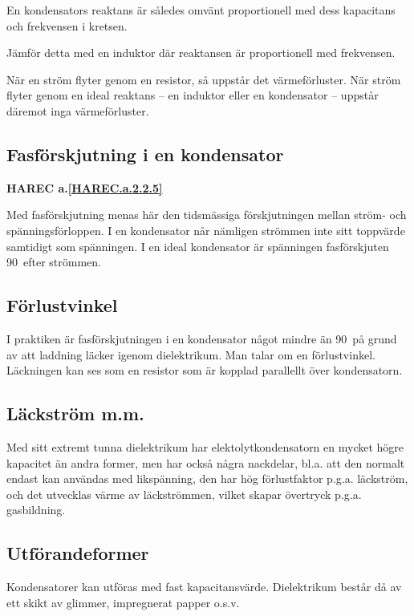 En kondensators reaktans är således omvänt proportionell med dess kapacitans
och frekvensen i kretsen.

Jämför detta med en induktor där reaktansen är proportionell med frekvensen.

När en ström flyter genom en resistor, så uppstår det värmeförluster. När ström
flyter genom en ideal reaktans -- en induktor eller en kondensator -- uppstår
däremot inga värmeförluster.

\subsection{Fasförskjutning i en kondensator}
\textbf{HAREC a.\ref{HAREC.a.2.2.5}\label{myHAREC.a.2.2.5}}

Med fasförskjutning menas här den tidsmässiga förskjutningen mellan ström- och
spänningsförloppen. I en kondensator når nämligen strömmen inte sitt toppvärde
samtidigt som spänningen. I en ideal kondensator är spänningen fasförskjuten
90\degree~efter strömmen.

\subsection{Förlustvinkel}

I praktiken är fasförskjutningen i en kondensator något mindre än 90\degree~på
grund av att laddning läcker igenom dielektrikum. Man talar om en förlustvinkel.
Läckningen kan ses som en resistor som är kopplad parallellt över kondensatorn.

\subsection{Läckström m.m.}

Med sitt extremt tunna dielektrikum har elektolytkondensatorn en mycket högre
kapacitet än andra former, men har också några nackdelar, bl.a. att den normalt
endast kan användas med likspänning, den har hög förlustfaktor p.g.a. läckström,
och det utvecklas värme av läckströmmen, vilket skapar övertryck p.g.a.
gasbildning.

\subsection{Utförandeformer}

Kondensatorer kan utföras med fast kapacitansvärde. Dielektrikum består då av
ett skikt av glimmer, impregnerat papper o.s.v.


